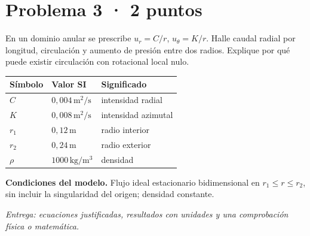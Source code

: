 \par\medskip\noindent\begin{minipage}{\linewidth}

\section{Problema 3 · 2 puntos}

En un dominio anular se prescribe $u_r=C/r$, $u_\theta=K/r$. Halle caudal radial por longitud, circulación y aumento de presión entre dos radios. Explique por qué puede existir circulación con rotacional local nulo.

\begin{tabular}{@{}p{.15\linewidth}p{.23\linewidth}p{.54\linewidth}@{}}
\toprule Símbolo & Valor SI & Significado\\\midrule
$C$ & $0{,}004\,\mathrm{m^2/s}$ & intensidad radial\\
$K$ & $0{,}008\,\mathrm{m^2/s}$ & intensidad azimutal\\
$r_1$ & $0{,}12\,\mathrm{m}$ & radio interior\\
$r_2$ & $0{,}24\,\mathrm{m}$ & radio exterior\\
$\rho$ & $1000\,\mathrm{kg/m^3}$ & densidad\\
\bottomrule\end{tabular}

\par\medskip\textbf{Condiciones del modelo.} Flujo ideal estacionario bidimensional en $r_1\le r\le r_2$, sin incluir la singularidad del origen; densidad constante.

\par\textit{Entrega: ecuaciones justificadas, resultados con unidades y una comprobación física o matemática.}

\end{minipage}\par\medskip

